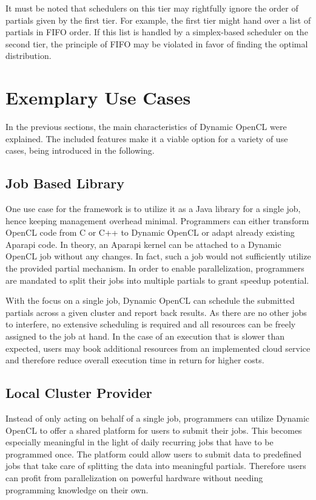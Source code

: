 It must be noted that schedulers on this tier may rightfully ignore the order of partials given by the first tier. For example, the first tier might hand over a list of partials in FIFO order. If this list is handled by a simplex-based scheduler on the second tier, the principle of FIFO may be violated in favor of finding the optimal distribution.

\section{Exemplary Use Cases}
\label{use_cases}
In the previous sections, the main characteristics of Dynamic OpenCL were explained. The included features make it a viable option for a variety of use cases, being introduced in the following.

\subsection*{Job Based Library}

One use case for the framework is to utilize it as a Java library for a single job, hence keeping management overhead minimal. Programmers can either transform OpenCL code from C or C++ to Dynamic OpenCL or adapt already existing Aparapi code. In theory, an Aparapi kernel can be attached to a Dynamic OpenCL job without any changes. In fact, such a job would not sufficiently utilize the provided partial mechanism. In order to enable parallelization, programmers are mandated to split their jobs into multiple partials to grant speedup potential.

With the focus on a single job, Dynamic OpenCL can schedule the submitted partials across a given cluster and report back results. As there are no other jobs to interfere, no extensive scheduling is required and all resources can be freely assigned to the job at hand. In the case of an execution that is slower than expected, users may book additional resources from an implemented cloud service and therefore reduce overall execution time in return for higher costs.

\subsection*{Local Cluster Provider}

Instead of only acting on behalf of a single job, programmers can utilize Dynamic OpenCL to offer a shared platform for users to submit their jobs. This becomes especially meaningful in the light of daily recurring jobs that have to be programmed once. The platform could allow users to submit data to predefined jobs that take care of splitting the data into meaningful partials. Therefore users can profit from parallelization on powerful hardware without needing programming knowledge on their own.

